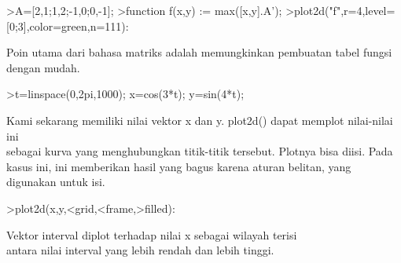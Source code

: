 \documentclass{article}
\begin{document}
\begin{eulernotebook}
\begin{eulercomment}
\begin{eulercomment}
\begin{eulercomment}
\begin{eulercomment}
\begin{eulercomment}
\begin{eulercomment}
\begin{eulercomment}
\begin{eulercomment}
\begin{eulerprompt}
>A=[2,1;1,2;-1,0;0,-1];
>function f(x,y) := max([x,y].A');
>plot2d("f",r=4,level=[0;3],color=green,n=111):
\end{eulerprompt}
\begin{eulercomment}
Poin utama dari bahasa matriks adalah memungkinkan pembuatan tabel
fungsi dengan mudah.
\end{eulercomment}
\begin{eulerprompt}
>t=linspace(0,2pi,1000); x=cos(3*t); y=sin(4*t);
\end{eulerprompt}
\begin{eulercomment}
Kami sekarang memiliki nilai vektor x dan y. plot2d() dapat memplot
nilai-nilai ini\\
sebagai kurva yang menghubungkan titik-titik tersebut. Plotnya bisa
diisi. Pada kasus ini, ini memberikan hasil yang bagus karena aturan
belitan, yang digunakan untuk isi.
\end{eulercomment}
\begin{eulerprompt}
>plot2d(x,y,<grid,<frame,>filled):
\end{eulerprompt}
\begin{eulercomment}
Vektor interval diplot terhadap nilai x sebagai wilayah terisi\\
antara nilai interval yang lebih rendah dan lebih tinggi.


\end{eulercomment}
\end{eulercomment}
\end{eulercomment}
\end{eulercomment}
\end{eulercomment}
\end{eulercomment}
\end{eulercomment}
\end{eulercomment}
\end{eulercomment}
\end{eulernotebook}
\end{document}
